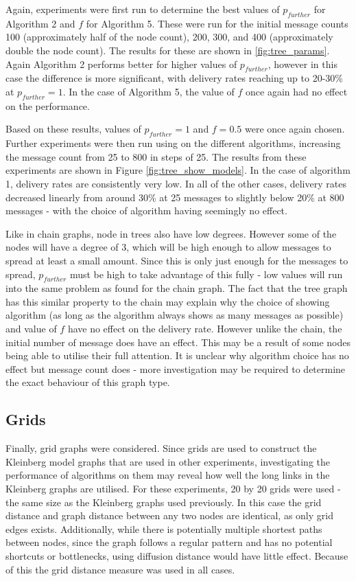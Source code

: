 \documentclass[bsc,frontabs,twoside,singlespacing,parskip,deptreport]{infthesis}     %
\begin{document}
Again, experiments were first run to determine the best values of $p_{further}$ for Algorithm 2 and $f$ for Algorithm 5. These were run for the initial message counts 100 (approximately half of the node count), 200, 300, and 400 (approximately double the node count). The results for these are shown in \ref{fig:tree_params}. Again Algorithm 2 performs better for higher values of $p_{further}$, however in this case the difference is more significant, with delivery rates reaching up to 20-30\% at $p_{further}=1$. In the case of Algorithm 5, the value of $f$ once again had no effect on the performance.

Based on these results, values of $p_{further}=1$ and $f=0.5$ were once again chosen. Further experiments were then run using on the different algorithms, increasing the message count from 25 to 800 in steps of 25. The results from these experiments are shown in Figure \ref{fig:tree_show_models}. In the case of algorithm 1, delivery rates are consistently very low. In all of the other cases, delivery rates decreased linearly from around 30\% at 25 messages to slightly below 20\% at 800 messages - with the choice of algorithm having seemingly no effect.

Like in chain graphs, node in trees also have low degrees. However some of the nodes will have a degree of 3, which will be high enough to allow messages to spread at least a small amount. Since this is only just enough for the messages to spread, $p_{further}$ must be high to take advantage of this fully - low values will run into the same problem as found for the chain graph. The fact that the tree graph has this similar property to the chain may explain why the choice of showing algorithm (as long as the algorithm always shows as many messages as possible) and value of $f$ have no effect on the delivery rate. However unlike the chain, the initial number of message does have an effect. This may be a result of some nodes being able to utilise their full attention. It is unclear why algorithm choice has no effect but message count does - more investigation may be required to determine the exact behaviour of this graph type.


\subsection{Grids}
Finally, grid graphs were considered. Since grids are used to construct the Kleinberg model graphs that are used in other experiments, investigating the performance of algorithms on them may reveal how well the long links in the Kleinberg graphs are utilised. For these experiments, 20 by 20 grids were used - the same size as the Kleinberg graphs used previously. In this case the grid distance and graph distance between any two nodes are identical, as only grid edges exists. Additionally, while there is potentially multiple shortest paths between nodes, since the graph follows a regular pattern and has no potential shortcuts or bottlenecks, using diffusion distance would have little effect. Because of this the grid distance measure was used in all cases.
\end{document}
